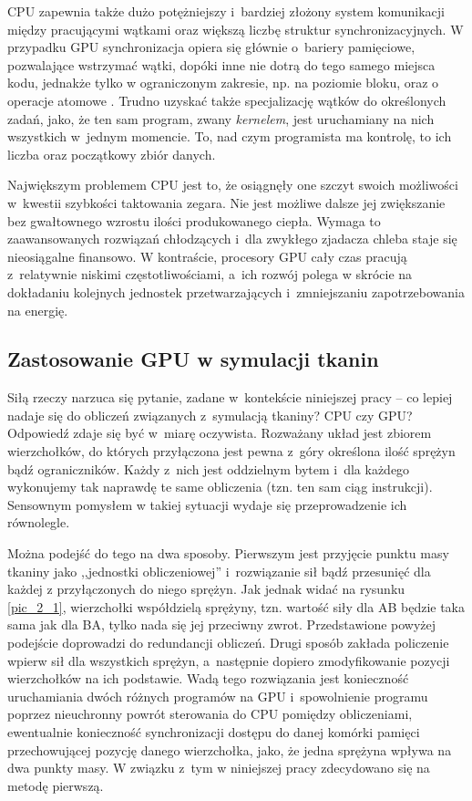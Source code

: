 		CPU zapewnia także dużo potężniejszy i~bardziej złożony system komunikacji między pracującymi wątkami oraz większą liczbę struktur synchronizacyjnych. W przypadku GPU synchronizacja opiera się głównie o~bariery pamięciowe, pozwalające wstrzymać wątki, dopóki inne nie dotrą do tego samego miejsca kodu, jednakże tylko w ograniczonym zakresie, np. na poziomie bloku, oraz o operacje atomowe \cite{cuda}. Trudno uzyskać także specjalizację wątków do określonych zadań, jako, że ten sam program, zwany \emph{kernelem}, jest uruchamiany na nich wszystkich w~jednym momencie. To, nad czym programista ma kontrolę, to ich liczba oraz początkowy zbiór danych.
		
		Największym problemem CPU jest to, że osiągnęły one szczyt swoich możliwości w~kwestii szybkości taktowania zegara. Nie jest możliwe dalsze jej zwiększanie bez gwałtownego wzrostu ilości produkowanego ciepła. Wymaga to zaawansowanych rozwiązań chłodzących i~dla zwykłego zjadacza chleba staje się nieosiągalne finansowo. W kontraście, procesory GPU cały czas pracują z~relatywnie niskimi częstotliwościami, a~ich rozwój polega w skrócie na dokładaniu kolejnych jednostek przetwarzających i~zmniejszaniu zapotrzebowania na energię.
		
		\subsection{Zastosowanie GPU w symulacji tkanin}
		\label{t:teoria:gpu:zalety}
		
		Siłą rzeczy narzuca się pytanie, zadane w~kontekście niniejszej pracy -- co lepiej nadaje się do obliczeń związanych z~symulacją tkaniny? CPU czy GPU? Odpowiedź zdaje się być w~miarę oczywista. Rozważany układ jest zbiorem wierzchołków, do których przyłączona jest pewna z~góry określona ilość sprężyn bądź ograniczników. Każdy z~nich jest oddzielnym bytem i~dla każdego wykonujemy tak naprawdę te same obliczenia (tzn. ten sam ciąg instrukcji). Sensownym pomysłem w takiej sytuacji wydaje się przeprowadzenie ich równolegle. 
		
		Można podejść do tego na dwa sposoby. Pierwszym jest przyjęcie punktu masy tkaniny jako ,,jednostki obliczeniowej'' i~rozwiązanie sił bądź przesunięć dla każdej z przyłączonych do niego sprężyn. Jak jednak widać na rysunku \ref{pic_2_1}, wierzchołki współdzielą sprężyny, tzn. wartość siły dla AB będzie taka sama jak dla BA, tylko nada się jej przeciwny zwrot. Przedstawione powyżej podejście doprowadzi do redundancji obliczeń. Drugi sposób zakłada policzenie wpierw sił dla wszystkich sprężyn, a~następnie dopiero zmodyfikowanie pozycji wierzchołków na ich podstawie. Wadą tego rozwiązania jest konieczność uruchamiania dwóch różnych programów na GPU i~spowolnienie programu poprzez nieuchronny powrót sterowania do CPU pomiędzy obliczeniami, ewentualnie konieczność synchronizacji dostępu do danej komórki pamięci przechowującej pozycję danego wierzchołka, jako, że jedna sprężyna wpływa na dwa punkty masy. W związku z~tym w niniejszej pracy zdecydowano się na metodę pierwszą.
		
